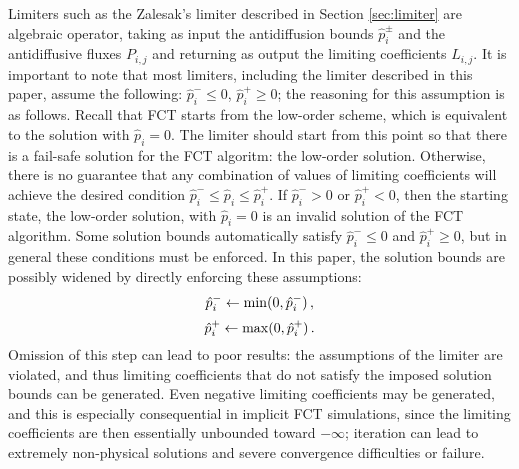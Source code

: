 Limiters such as the Zalesak's limiter described in Section \ref{sec:limiter} are algebraic
operator, taking as input the antidiffusion bounds
$\hat{p}_i^\pm$ and the antidiffusive fluxes $P_{i,j}$ and returning as output the
limiting coefficients $L_{i,j}$. It is important to note that most limiters,
including the limiter described in this paper, assume the following:
$\hat{p}_i^-\leq 0$, $\hat{p}_i^+\geq 0$; the reasoning for this assumption
is as follows. Recall that FCT starts from the
low-order scheme, which is equivalent to the solution with $\hat{p}_i=0$.
The limiter should start from this point so that there is a fail-safe solution
for the FCT algoritm: the low-order solution. Otherwise, there is no guarantee
that any combination of values of limiting coefficients will achieve
the desired condition $\hat{p}_i^-\leq \hat{p}_i\leq \hat{p}_i^+$. If
$\hat{p}_i^- > 0$ or $\hat{p}_i^+ < 0$, then the starting state, the low-order
solution, with $\hat{p}_i=0$ is an invalid solution of the FCT algorithm.
Some solution bounds automatically satisfy $\hat{p}_i^-\leq 0$ and $\hat{p}_i^+\geq 0$,
but in general these conditions must be enforced. In this paper, the solution
bounds are possibly widened by directly enforcing these assumptions:
\begin{equation}
  \hat{p}_i^- \gets \min(0,\hat{p}_i^-) \,,
\end{equation}
\begin{equation}
  \hat{p}_i^+ \gets \max(0,\hat{p}_i^+) \,.
\end{equation}
Omission of this step can lead to poor results: the assumptions of the
limiter are violated, and thus limiting coefficients that do not satisfy the
imposed solution bounds can be generated. Even negative limiting coefficients
may be generated, and this is especially consequential in implicit FCT
simulations, since the limiting coefficients are then essentially unbounded
toward $-\infty$; iteration can lead to extremely non-physical solutions
and severe convergence difficulties or failure. 


